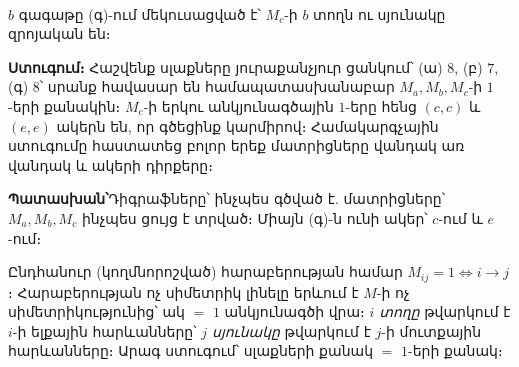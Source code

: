 \documentclass[11pt,a4paper]{article}
\newcommand{\answer}[1]{\begin{answerbox}\centering\textbf{Պատասխան՝}\quad #1\end{answerbox}}
\begin{document}
\begin{center}
\\[2pt]
{\small $b$ գագաթը (գ)-ում մեկուսացված է՝ $M_c$-ի $b$ տողն ու սյունակը զրոյական են։}
\end{center}

\textbf{Ստուգում։} Հաշվենք սլաքները յուրաքանչյուր ցանկում՝ (ա) $8$, (բ) $7$, (գ) $8$՝ սրանք հավասար են
համապատասխանաբար $M_a,M_b,M_c$-ի $1$-երի քանակին։ $M_c$-ի երկու անկյունագծային $1$-երը հենց $(c,c)$ և
$(e,e)$ ակերն են, որ գծեցինք կարմիրով։ Համակարգչային ստուգումը հաստատեց բոլոր երեք մատրիցները վանդակ
առ վանդակ և ակերի դիրքերը։ \checkmark

\answer{Դիգրաֆները՝ ինչպես գծված է. մատրիցները՝ $M_a,M_b,M_c$ ինչպես ցույց է տրված։ Միայն (գ)-ն ունի
ակեր՝ $c$-ում և $e$-ում։}

\begin{methodbox}
Ընդհանուր (կողմնորոշված) հարաբերության համար $M_{ij}=1\iff i\to j$։
Հարաբերության ոչ սիմետրիկ լինելը երևում է $M$-ի ոչ սիմետրիկությունից՝ ակ $=$ $1$ անկյունագծի վրա։ \emph{$i$ տողը}
թվարկում է $i$-ի ելքային հարևանները՝ \emph{$j$ սյունակը} թվարկում է $j$-ի մուտքային հարևանները։ Արագ
ստուգում՝ սլաքների քանակ $=$ $1$-երի քանակ։
\end{methodbox}
\end{document}
